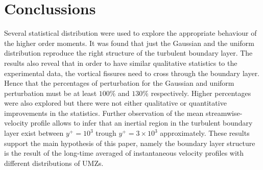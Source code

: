 \documentclass[aps,reprint,amsmath,amssymb,pra]{revtex4-1}%
\begin{document}
\section{Conclussions}
Several statistical distribution were used to explore the appropriate behaviour of the higher order moments. It was found that just the Gaussian and the uniform distribution reproduce the right structure of the turbulent boundary layer. The results also reveal that in order to have similar qualitative statistics to the experimental data, the vortical fissures need to cross through the boundary layer. Hence that the percentages of perturbation for the Gaussian and uniform perturbation must be at least $100\%$ and $130\%$ respectively. Higher percentages were also explored but there were not either qualitative or quantitative improvements in the statistics. Further observation of the mean streamwise-velocity profile allows to infer that an inertial region in the turbulent boundary layer exist between $y^+=10^3$ trough $y^+=3\times 10^3$ approximately.  These results support the main hypothesis of this paper, namely the boundary layer structure is the result of the long-time averaged of instantaneous velocity profiles with different distributions of UMZs. 

\end{document}
